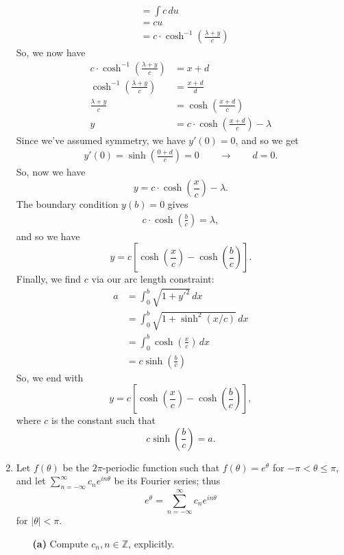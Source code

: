 \documentclass[10pt,letterpaper]{report}
\newcommand{\Z}{\mathbb{Z}}
\newcommand{\so}{\qquad \rightarrow \qquad}
\newcommand{\abs}[1]{\left|{#1}\right|}
\begin{document}
\begin{enumerate}
\begin{align*}
    \\
    &=
    \int c\,du
    \\
    &= c u
    \\
    &= c \cdot \cosh^{-1}\left(\frac{\lambda + y}{c}\right)
\end{align*}
So, we now have
\begin{align*}
    c \cdot \cosh^{-1}\left(\frac{\lambda + y}{c}\right) &= x + d
    \\
    \cosh^{-1}\left(\frac{\lambda + y}{c}\right) &= \frac{x + d}{d}
    \\
    \frac{\lambda + y}{c} &= \cosh\left(\frac{x + d}{c}\right)
    \\
    y &= c\cdot \cosh\left(\frac{x + d}{c}\right) - \lambda
\end{align*}
Since we've assumed symmetry, we have $y'(0) = 0$, and so we get
\begin{align*}
    y'(0) = \sinh\left(\frac{0 + d}{c}\right) = 0 \so d = 0.
\end{align*}
So, now we have
\[
y = c\cdot \cosh\left(\frac{x}{c}\right) - \lambda.
\]
The boundary condition $y(b) = 0$ gives
\begin{align*}
    c\cdot \cosh\left(\frac{b}{c}\right) = \lambda,
\end{align*}
and so we have
\[
y = c\left[ \cosh\left(\frac{x}{c}\right) - \cosh\left(\frac{b}{c}\right)\right].
\]
Finally, we find $c$ via our arc length constraint:
\begin{align*}
    a &= \int_0^b \sqrt{1 + y'^2}\,dx
    \\
    &= \int_0^b \sqrt{1 + \sinh^2(x/c)}\,dx
    \\
    &= \int_0^b \cosh\left(\frac{x}{c}\right)\,dx
    \\
    &=
    c\sinh\left(\frac{b}{c}\right)
\end{align*}
So, we end with
\[
y = c\left[ \cosh\left(\frac{x}{c}\right) - \cosh\left(\frac{b}{c}\right)\right],
\]
where $c$ is the constant such that
\[
c\sinh\left(\frac{b}{c}\right) = a.
\]

\item \begin{qbox}
Let $f(\theta)$ be the $2\pi$-periodic function such that $f(\theta) = e^\theta$ for $-\pi < \theta \leq \pi$, and let $\sum_{n = -\infty}^\infty c_n e^{in\theta}$ be its Fourier series; thus 
\[
e^\theta = \sum_{n = -\infty}^\infty c_ne^{in\theta}
\]
for $\abs \theta < \pi$.
\begin{itemize}
    \item[\textbf{(a)}] Compute $c_n, n \in \Z$, explicitly.
    

\end{itemize}
\end{qbox}
\end{enumerate}
\end{document}
